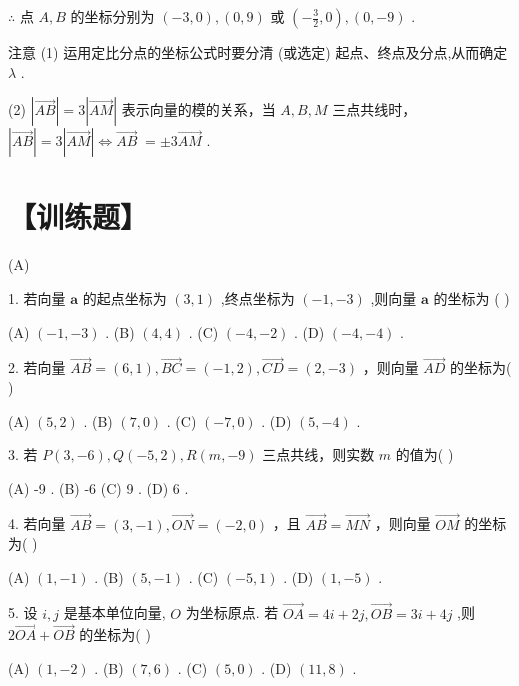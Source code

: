 \documentclass[10pt]{article}
\begin{document}
\(\therefore\) 点 \(A,B\) 的坐标分别为 \(\left( {-3,0}\right) ,\left( {0,9}\right)\) 或 \(\left( {-\frac{3}{2},0}\right) ,\left( {0, - 9}\right)\) .

注意 (1) 运用定比分点的坐标公式时要分清 (或选定) 起点、终点及分点,从而确定 \(\lambda\) .

(2) \(\left| \overrightarrow{AB}\right|  = 3\left| \overrightarrow{AM}\right|\) 表示向量的模的关系，当 \(A,B,M\) 三点共线时， \(\left| \overrightarrow{AB}\right|  = 3\left| \overrightarrow{AM}\right|  \Leftrightarrow  \overrightarrow{AB} \; =  \pm  3\overrightarrow{AM}\) .

\section*{【训练题】}

(A)

1. 若向量 \(\mathbf{a}\) 的起点坐标为 \(\left( {3,1}\right)\) ,终点坐标为 \(\left( {-1, - 3}\right)\) ,则向量 \(\mathbf{a}\) 的坐标为 ( )

(A) \(\left( {-1, - 3}\right)\) . (B) \(\left( {4,4}\right)\) . (C) \(\left( {-4, - 2}\right)\) . (D) \(\left( {-4, - 4}\right)\) .

2. 若向量 \(\overrightarrow{AB} = \left( {6,1}\right) ,\overrightarrow{BC} = \left( {-1,2}\right) ,\overrightarrow{CD} = \left( {2, - 3}\right)\) ，则向量 \(\overrightarrow{AD}\) 的坐标为( )

(A) \(\left( {5,2}\right)\) . (B) \(\left( {7,0}\right)\) . (C) \(\left( {-7,0}\right)\) . (D) \(\left( {5, - 4}\right)\) .

3. 若 \(P\left( {3, - 6}\right) ,Q\left( {-5,2}\right) ,R\left( {m, - 9}\right)\) 三点共线，则实数 \(m\) 的值为( )

(A) -9 . (B) -6 (C) 9 . (D) 6 .

4. 若向量 \(\overrightarrow{AB} = \left( {3, - 1}\right) ,\overrightarrow{ON} = \left( {-2,0}\right)\) ，且 \(\overrightarrow{AB} = \overrightarrow{MN}\) ，则向量 \(\overrightarrow{OM}\) 的坐标为( )

(A) \(\left( {1, - 1}\right)\) . (B) \(\left( {5, - 1}\right)\) . (C) \(\left( {-5,1}\right)\) . (D) \(\left( {1, - 5}\right)\) .

5. 设 \(i,j\) 是基本单位向量, \(O\) 为坐标原点. 若 \(\overrightarrow{OA} = {4i} + {2j},\overrightarrow{OB} = {3i} + {4j}\) ,则 \(2\overrightarrow{OA} + \overrightarrow{OB}\) 的坐标为( )

(A) \(\left( {1, - 2}\right)\) . (B) \(\left( {7,6}\right)\) . (C) \(\left( {5,0}\right)\) . (D) \(\left( {{11},8}\right)\) .
\end{document}
